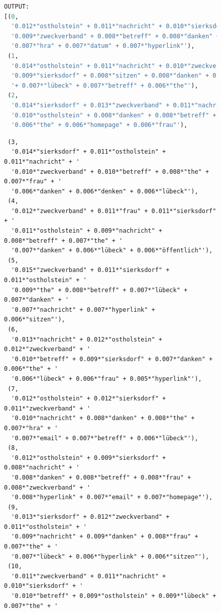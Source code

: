 \documentclass[german,version-2020-11]{uzl-thesis}
\begin{document}
\begin{itemize}
\begin{enumerate}
\begin{figure}[H]
\begin{lstlisting}[language=Python]
OUTPUT:
[(0,
  '0.012*"ostholstein" + 0.011*"nachricht" + 0.010*"sierksdorf" + '
  '0.009*"zweckverband" + 0.008*"betreff" + 0.008*"danken" + 0.007*"email" + '
  '0.007*"hra" + 0.007*"datum" + 0.007*"hyperlink"'),
 (1,
  '0.014*"ostholstein" + 0.011*"nachricht" + 0.010*"zweckverband" + '
  '0.009*"sierksdorf" + 0.008*"sitzen" + 0.008*"danken" + 0.007*"wagrienring" '
  '+ 0.007*"lübeck" + 0.007*"betreff" + 0.006*"the"'),
 (2,
  '0.014*"sierksdorf" + 0.013*"zweckverband" + 0.011*"nachricht" + '
  '0.010*"ostholstein" + 0.008*"danken" + 0.008*"betreff" + 0.007*"sitzen" + '
  '0.006*"the" + 0.006*"homepage" + 0.006*"frau"'),
  \end{lstlisting}
  \end{figure}
  \newpage
  \begin{figure}[h]
  \begin{lstlisting}
 (3,
  '0.014*"sierksdorf" + 0.011*"ostholstein" + 0.011*"nachricht" + '
  '0.010*"zweckverband" + 0.010*"betreff" + 0.008*"the" + 0.007*"frau" + '
  '0.006*"danken" + 0.006*"denken" + 0.006*"lübeck"'),
 (4,
  '0.012*"zweckverband" + 0.011*"frau" + 0.011*"sierksdorf" + '
  '0.011*"ostholstein" + 0.009*"nachricht" + 0.008*"betreff" + 0.007*"the" + '
  '0.007*"danken" + 0.006*"lübeck" + 0.006*"öffentlich"'),
 (5,
  '0.015*"zweckverband" + 0.011*"sierksdorf" + 0.011*"ostholstein" + '
  '0.009*"the" + 0.008*"betreff" + 0.007*"lübeck" + 0.007*"danken" + '
  '0.007*"nachricht" + 0.007*"hyperlink" + 0.006*"sitzen"'),
 (6,
  '0.013*"nachricht" + 0.012*"ostholstein" + 0.012*"zweckverband" + '
  '0.010*"betreff" + 0.009*"sierksdorf" + 0.007*"danken" + 0.006*"the" + '
  '0.006*"lübeck" + 0.006*"frau" + 0.005*"hyperlink"'),
 (7,
  '0.012*"ostholstein" + 0.012*"sierksdorf" + 0.011*"zweckverband" + '
  '0.010*"nachricht" + 0.008*"danken" + 0.008*"the" + 0.007*"hra" + '
  '0.007*"email" + 0.007*"betreff" + 0.006*"lübeck"'),
 (8,
  '0.012*"ostholstein" + 0.009*"sierksdorf" + 0.008*"nachricht" + '
  '0.008*"danken" + 0.008*"betreff" + 0.008*"frau" + 0.008*"zweckverband" + '
  '0.008*"hyperlink" + 0.007*"email" + 0.007*"homepage"'),
 (9,
  '0.013*"sierksdorf" + 0.012*"zweckverband" + 0.011*"ostholstein" + '
  '0.009*"nachricht" + 0.009*"danken" + 0.008*"frau" + 0.007*"the" + '
  '0.007*"lübeck" + 0.006*"hyperlink" + 0.006*"sitzen"'),
 (10,
  '0.011*"zweckverband" + 0.011*"nachricht" + 0.010*"sierksdorf" + '
  '0.010*"betreff" + 0.009*"ostholstein" + 0.009*"lübeck" + 0.007*"the" + '

\end{lstlisting}
\end{figure}
\end{enumerate}
\end{itemize}
\end{document}

